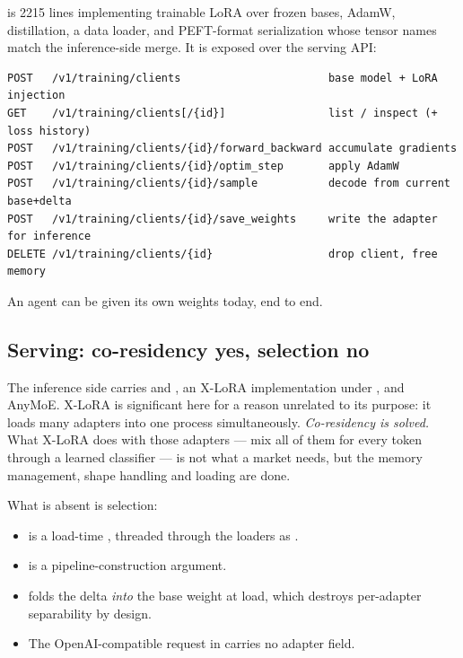 \documentclass[11pt,a4paper]{article}
\begin{document}
 is \num{2215} lines implementing trainable LoRA over frozen
bases, AdamW, distillation, a data loader, and PEFT-format serialization whose
tensor names match the inference-side merge. It is exposed over the serving API:

\begin{lstlisting}
POST   /v1/training/clients                       base model + LoRA injection
GET    /v1/training/clients[/{id}]                list / inspect (+ loss history)
POST   /v1/training/clients/{id}/forward_backward accumulate gradients
POST   /v1/training/clients/{id}/optim_step       apply AdamW
POST   /v1/training/clients/{id}/sample           decode from current base+delta
POST   /v1/training/clients/{id}/save_weights     write the adapter for inference
DELETE /v1/training/clients/{id}                  drop client, free memory
\end{lstlisting}

An agent can be given its own weights today, end to end.

\subsection{Serving: co-residency yes, selection no}

The inference side carries  and
, an X-LoRA implementation under
, and AnyMoE. X-LoRA is significant here
for a reason unrelated to its purpose: it loads many adapters into one process
simultaneously. \emph{Co-residency is solved.} What X-LoRA does with those
adapters --- mix all of them for every token through a learned classifier --- is
not what a market needs, but the memory management, shape handling and loading
are done.

What is absent is selection:

\begin{itemize}[leftmargin=1.4em]
\item {} is a load-time , threaded through
      the loaders as .
\item {} is a pipeline-construction argument.
\item {} folds the delta \emph{into}
      the base weight at load, which destroys per-adapter separability by design.
\item The OpenAI-compatible request in 
      carries no adapter field.
\end{itemize}
\end{document}
